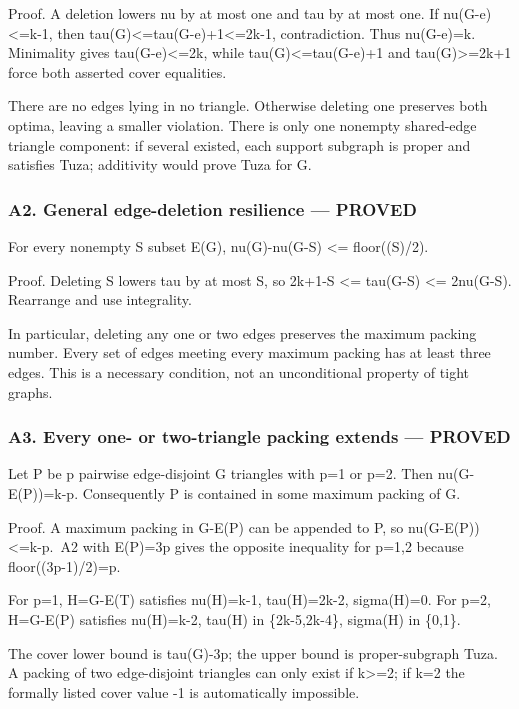 \documentclass[11pt]{article}
\begin{document}
Proof. A deletion lowers nu by at most one and tau by at most one. If nu(G-e)\textless=k-1, then tau(G)\textless=tau(G-e)+1\textless=2k-1, contradiction. Thus nu(G-e)=k. Minimality gives tau(G-e)\textless=2k, while tau(G)\textless=tau(G-e)+1 and tau(G)\textgreater=2k+1 force both asserted cover equalities.

There are no edges lying in no triangle. Otherwise deleting one preserves both optima, leaving a smaller violation. There is only one nonempty shared-edge triangle component: if several existed, each support subgraph is proper and satisfies Tuza; additivity would prove Tuza for G.

\subsubsection{A2. General edge-deletion resilience --- PROVED}\label{a2.-general-edge-deletion-resilience-proved}

For every nonempty S subset E(G), nu(G)-nu(G-S) \textless= floor((\textbar S)/2).

Proof. Deleting S lowers tau by at most \textbar S\textbar, so 2k+1-\textbar S\textbar{} \textless= tau(G-S) \textless= 2nu(G-S). Rearrange and use integrality.

In particular, deleting any one or two edges preserves the maximum packing number. Every set of edges meeting every maximum packing has at least three edges. This is a necessary condition, not an unconditional property of tight graphs.

\subsubsection{A3. Every one- or two-triangle packing extends --- PROVED}\label{a3.-every-one--or-two-triangle-packing-extends-proved}

Let P be p pairwise edge-disjoint G triangles with p=1 or p=2. Then nu(G-E(P))=k-p. Consequently P is contained in some maximum packing of G.

Proof. A maximum packing in G-E(P) can be appended to P, so nu(G-E(P))\textless=k-p.~A2 with \textbar E(P)\textbar=3p gives the opposite inequality for p=1,2 because floor((3p-1)/2)=p.

For p=1, H=G-E(T) satisfies nu(H)=k-1, tau(H)=2k-2, sigma(H)=0. For p=2, H=G-E(P) satisfies nu(H)=k-2, tau(H) in \{2k-5,2k-4\}, sigma(H) in \{0,1\}.

The cover lower bound is tau(G)-3p; the upper bound is proper-subgraph Tuza. A packing of two edge-disjoint triangles can only exist if k\textgreater=2; if k=2 the formally listed cover value -1 is automatically impossible.
\end{document}
